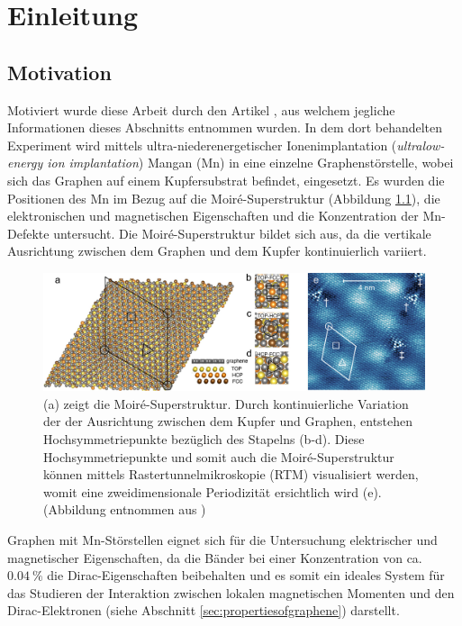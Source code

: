 \chapter{Einleitung}
\section{Motivation}
\label{sec:motivation}
Motiviert wurde diese Arbeit durch den Artikel \cite{doi:10.1021/acsnano.1c00139}, aus welchem jegliche Informationen dieses 
Abschnitts entnommen wurden.
In dem dort behandelten Experiment wird mittels ultra-niederenergetischer Ionenimplantation
(\textit{ultralow-energy ion implantation}) Mangan (Mn) in eine einzelne Graphenstörstelle, wobei sich das Graphen auf einem Kupfersubstrat befindet, eingesetzt.
Es wurden die Positionen des Mn im Bezug auf die Moiré-Superstruktur (Abbildung \ref{fig:ascnano_structure}), die elektronischen und magnetischen Eigenschaften und die Konzentration der Mn-Defekte
untersucht.
Die Moiré-Superstruktur bildet sich aus, da die vertikale Ausrichtung zwischen dem Graphen und dem Kupfer kontinuierlich variiert.
\begin{figure}[H]
    \centering
    \includegraphics[width = \textwidth]{Plots/images_large_nn1c00139_0002.jpeg}
    \caption{(a) zeigt die Moiré-Superstruktur. Durch kontinuierliche Variation der der Ausrichtung 
    zwischen dem Kupfer und Graphen, entstehen Hochsymmetriepunkte bezüglich des Stapelns (b-d).
    Diese Hochsymmetriepunkte und somit auch die Moiré-Superstruktur können mittels Rastertunnelmikroskopie (RTM) 
    visualisiert werden, womit eine zweidimensionale Periodizität ersichtlich wird (e).
    (Abbildung entnommen  aus \cite{doi:10.1021/acsnano.1c00139})}
    \label{fig:ascnano_structure}
\end{figure}
Graphen mit Mn-Störstellen eignet sich für die Untersuchung elektrischer und magnetischer Eigenschaften, da die Bänder bei einer Konzentration von ca. $\qty{0.04}{\percent}$ 
die Dirac-Eigenschaften beibehalten und es somit ein ideales System für das Studieren der Interaktion
zwischen lokalen magnetischen Momenten und den Dirac-Elektronen (siehe Abschnitt \ref{sec:propertiesofgraphene}) darstellt.
